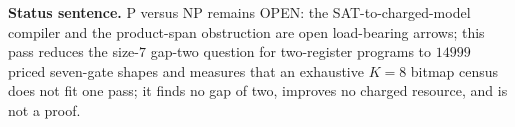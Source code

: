 \documentclass[11pt]{article}
\begin{document}
\bigskip
\noindent\textbf{Status sentence.} P versus NP remains OPEN: the SAT-to-charged-model compiler and the product-span obstruction are open load-bearing arrows; this pass reduces the size-$7$ gap-two question for two-register programs to $14999$ priced seven-gate shapes and measures that an exhaustive $K=8$ bitmap census does not fit one pass; it finds no gap of two, improves no charged resource, and is not a proof.
\end{document}
